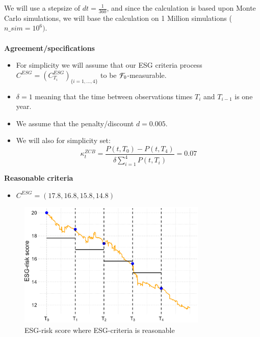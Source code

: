 We will use a stepsize of $dt = \frac{1}{360}$, and since the calculation is based upon Monte Carlo simulations, we will base the calculation on 1 Million simulations ($n\_sim = 10^{6})$. 
\\~\\ 
\textbf{Agreement/specifications}
\begin{itemize}
    \item For simplicity we will assume that our ESG criteria process $C^{ESG} = (C^{ESG}_{T_{i}})_{
    \{i=1, \dots, 4\}}$ to be $\mathcal{F}_{0}$-measurable. 
    \item $\delta = 1$ meaning that the time between observations times $T_{i}$ and $T_{i-1}$ is one year. 
    \item We assume that the penalty/discount $d = 0.005$.
    \item We will also for simplicity set: 
    \[
    \kappa_{t}^{ZCB} = \frac{P(t,T_{0})-P(t,T_{4})}{\delta \sum_{i=1}^{4}P(t,T_{i})} = 0.07
    \]
\end{itemize}
\newpage 

\textbf{Reasonable criteria}
\begin{itemize}
    \item $C^{ESG} = (17.8, 16.8, 15.8, 14.8)$
\end{itemize}

\begin{figure}[htp]
    \centering
    \includegraphics[width= 9cm]{figures/ESG/ESG_plt_criteria1.png}
    \caption{ESG-risk score where ESG-criteria is reasonable}
    \label{fig: ESG_risk_criteria1}
\end{figure}

